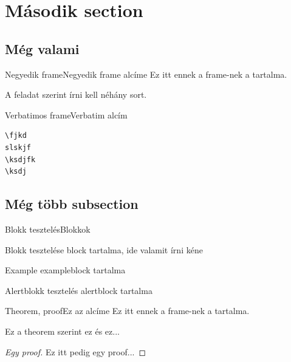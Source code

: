 \documentclass[aspectratio=169, bigger, xcolor={table}]{beamer}
\begin{document}
\section{Második section}
\subsection{Még valami}
\begin{frame}{Negyedik frame}{Negyedik frame alcíme}
Ez itt ennek a frame-nek a tartalma.

A feladat szerint írni kell néhány sort.
\end{frame}

\begin{frame}[fragile]{Verbatimos frame}{Verbatim alcím}

\begin{verbatim}
\fjkd
slskjf
\ksdjfk
\ksdj
\end{verbatim}

\end{frame}

\subsection{Még több subsection}
\begin{frame}{Blokk tesztelés}{Blokkok}
\begin{block}{Blokk tesztelése}
block tartalma, ide valamit írni kéne
\end{block}

\begin{exampleblock}{Example}
exampleblock tartalma
\end{exampleblock}

\begin{alertblock}{Alertblokk tesztelés}
alertblock tartalma
\end{alertblock}

\end{frame}

\begin{frame}{Theorem, proof}{Ez az alcíme}
Ez itt ennek a frame-nek a tartalma.
\begin{theorem}
Ez a theorem szerint ez és ez...
\end{theorem}

\begin{proof}[Egy proof]
Ez itt pedig egy proof...
\end{proof}
\end{frame}
\end{document}
